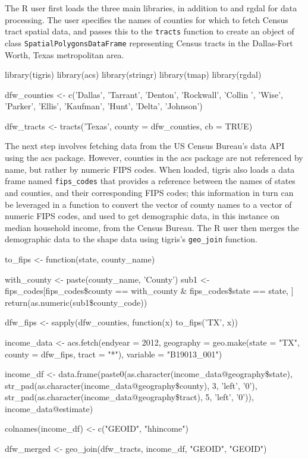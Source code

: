 The R user first loads the three main libraries, in addition to
 and rgdal for data processing. The user specifies the
names of counties for which to fetch Census tract spatial data, and
passes this to the \texttt{tracts} function to create an object of class
\texttt{SpatialPolygonsDataFrame} representing Census tracts in the
Dallas-Fort Worth, Texas metropolitan area.

\begin{Schunk}
\begin{Sinput}
library(tigris)
library(acs)
library(stringr)
library(tmap)
library(rgdal)

dfw_counties <- c('Dallas', 'Tarrant', 'Denton', 'Rockwall', 'Collin ', 
                  'Wise', 'Parker', 'Ellis', 'Kaufman', 'Hunt', 'Delta', 'Johnson')

dfw_tracts <- tracts('Texas', county = dfw_counties, cb = TRUE)
\end{Sinput}
\end{Schunk}

The next step involves fetching data from the US Census Bureau's data
API using the acs package. However, counties in the acs package are not
referenced by name, but rather by numeric FIPS codes. When loaded,
tigris also loads a data frame named \texttt{fips\_codes} that provides
a reference between the names of states and counties, and their
corresponding FIPS codes; this information in turn can be leveraged in a
function to convert the vector of county names to a vector of numeric
FIPS codes, and used to get demographic data, in this instance on median
household income, from the Census Bureau. The R user then merges the
demographic data to the shape data using tigris's \texttt{geo\_join}
function.

\begin{Schunk}
\begin{Sinput}
to_fips <- function(state, county_name) {
  with_county <- paste(county_name, 'County')
  sub1 <- fips_codes[fips_codes\$county == with_county & fips_codes\$state == state, ]
  return(as.numeric(sub1\$county_code))
    
}

dfw_fips <- sapply(dfw_counties, function(x) to_fips('TX', x))

income_data <- acs.fetch(endyear = 2012, 
                         geography = geo.make(state = "TX", 
                                              county = dfw_fips, 
                                              tract = "*"), 
                         variable = "B19013_001")

income_df <- data.frame(paste0(as.character(income_data@geography\$state), 
                               str_pad(as.character(income_data@geography\$county), 3, 'left', '0'), 
                               str_pad(as.character(income_data@geography\$tract), 5, 'left', '0')), 
                        income_data@estimate)

colnames(income_df) <- c("GEOID", "hhincome")

dfw_merged <- geo_join(dfw_tracts, income_df, "GEOID", "GEOID")
\end{Sinput}
\end{Schunk}

